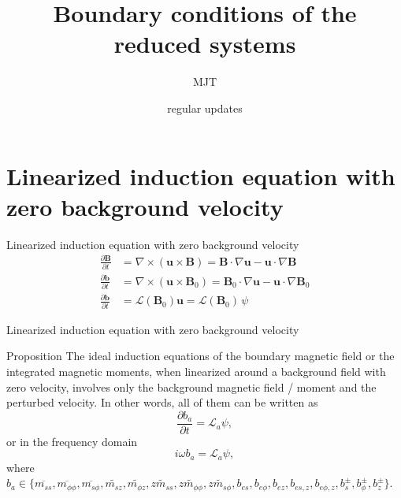 \documentclass[11pt,aspectratio=169]{beamer}
\title{Boundary conditions of the reduced systems}
\date[Sept 2023]{regular updates}
\author{MJT}
\institute{EPM}
\begin{document}

\titleframe




\section{Linearized induction equation with zero background velocity}

\begin{frame}{Linearized induction equation with zero background velocity}
	\[\begin{aligned}
		\frac{\partial \mathbf{B}}{\partial t} &= \nabla\times (\mathbf{u} \times \mathbf{B}) = \mathbf{B}\cdot \nabla \mathbf{u} - \mathbf{u}\cdot \nabla \mathbf{B} \\
		\frac{\partial \mathbf{b}}{\partial t} &= \nabla\times (\mathbf{u} \times \mathbf{B}_0) = \mathbf{B}_0\cdot \nabla \mathbf{u} - \mathbf{u}\cdot \nabla \mathbf{B}_0 \\
		\frac{\partial \mathbf{b}}{\partial t} &= \mathcal{L}({\mathbf{B}_0}) \mathbf{u} = \mathcal{L}(\mathbf{B}_0) \, \psi
	\end{aligned}\]
\end{frame}

\begin{frame}{Linearized induction equation with zero background velocity}
	\begin{block}{Proposition}
		The ideal induction equations of the boundary magnetic field or the integrated magnetic moments, when linearized around a background field with zero velocity, involves only the background magnetic field / moment and the perturbed velocity. In other words, all of them can be written as
		\[
			\frac{\partial b_a}{\partial t} = \mathcal{L}_a \psi,
		\]
		or in the frequency domain
		\[
			i\omega b_a = \mathcal{L}_a \psi,
		\]
		where $b_a \in \{\overline{m_{ss}},\overline{m_{\phi\phi}},\overline{m_{s\phi}},\widetilde{m_{sz}},\widetilde{m_{\phi z}},\widetilde{zm_{ss}},\widetilde{zm_{\phi\phi}},\widetilde{zm_{s\phi}},b_{es},b_{e\phi},b_{ez},b_{es,z},b_{e\phi,z},b_s^\pm,b_\phi^\pm,b_z^\pm\}$.
	\end{block}
\end{frame}
\end{document}
